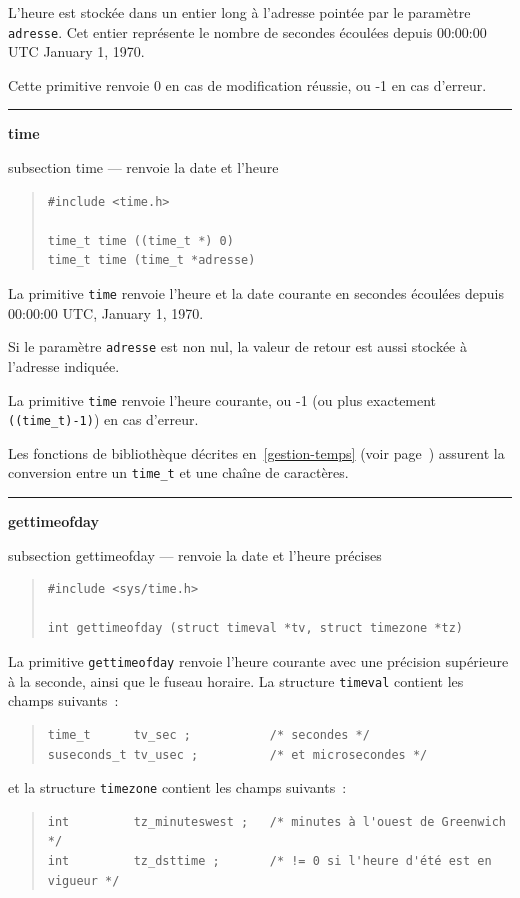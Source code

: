 \documentclass [twoside] {report}
\newcommand {\primitive} [1]
    {
	\phantomsection
	{\large \textbf {#1}}
	\addcontentsline {toc} {subsection} {#1}
    }
\newcommand {\separation}
    {
	\vspace {5mm}
	\nopagebreak
	\hrule
    }
\begin{document}
L'heure est stockée dans un entier long à
l'adresse pointée par le paramètre \texttt {adresse}. Cet
entier représente le nombre de secondes écoulées
depuis 00:00:00 UTC January 1, 1970.

Cette primitive renvoie 0 en cas de modification
réussie, ou -1 en cas d'erreur.




\separation
\primitive {time} --- renvoie la date et l'heure
    \label {time}

\begin {quote}
\begin {verbatim}
#include <time.h>

time_t time ((time_t *) 0)
time_t time (time_t *adresse)
\end{verbatim}
\end {quote}

La primitive \texttt {time} renvoie l'heure et la date
courante en secondes écoulées depuis
00:00:00 UTC, January 1, 1970.

Si le paramètre \texttt {adresse} est non nul, la valeur
de retour est aussi stockée à l'adresse
indiquée.

La primitive \texttt {time} renvoie l'heure courante, ou -1 (ou plus
exactement \verb|((time_t)-1)|) en cas d'erreur.

Les fonctions de bibliothèque décrites en~\ref {gestion-temps} (voir
page~\pageref {gestion-temps}) assurent la conversion entre un \texttt
{time\_t} et une chaîne de caractères.


\separation
\primitive {gettimeofday} --- renvoie la date et l'heure précises
    \label {gettimeofday}

\begin {quote}
\begin {verbatim}
#include <sys/time.h>

int gettimeofday (struct timeval *tv, struct timezone *tz)
\end{verbatim}
\end {quote}


La primitive \texttt {gettimeofday} renvoie l'heure courante avec une
précision supérieure à la seconde, ainsi que le fuseau horaire. La
structure \texttt {timeval} contient les champs suivants~:
\begin {quote}
\begin {verbatim}
time_t      tv_sec ;           /* secondes */
suseconds_t tv_usec ;          /* et microsecondes */
\end{verbatim}
\end {quote}
et la structure \texttt {timezone} contient les champs suivants~:
\begin {quote}
\begin {verbatim}
int         tz_minuteswest ;   /* minutes à l'ouest de Greenwich */
int         tz_dsttime ;       /* != 0 si l'heure d'été est en vigueur */
\end{verbatim}
\end {quote}
\end{document}
